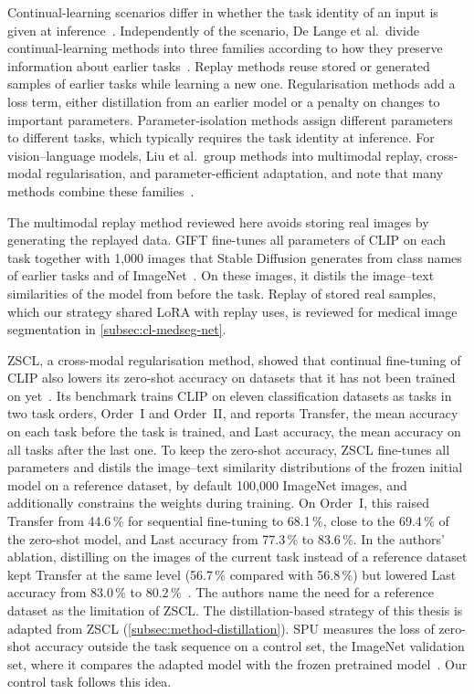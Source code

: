 Continual-learning scenarios differ in whether the task identity of an input is given at inference~\cite{van_de_Ven_2025}.
Independently of the scenario, De Lange et al.\ divide continual-learning methods into three families according to how they preserve information about earlier tasks~\cite[Sec.~3]{delange2022}.
Replay methods reuse stored or generated samples of earlier tasks while learning a new one.
Regularisation methods add a loss term, either distillation from an earlier model or a penalty on changes to important parameters.
Parameter-isolation methods assign different parameters to different tasks, which typically requires the task identity at inference.
For vision--language models, Liu et al.\ group methods into multimodal replay, cross-modal regularisation, and parameter-efficient adaptation, and note that many methods combine these families~\cite[Sec.~4]{liu2026continuallearningvlmssurvey}.

The multimodal replay method reviewed here avoids storing real images by generating the replayed data.
GIFT fine-tunes all parameters of CLIP on each task together with 1{,}000 images that Stable Diffusion generates from class names of earlier tasks and of ImageNet~\cite{wu2024gift}.
On these images, it distils the image--text similarities of the model from before the task.
Replay of stored real samples, which our strategy shared LoRA with replay uses, is reviewed for medical image segmentation in \cref{subsec:cl-medseg-net}.

ZSCL, a cross-modal regularisation method, showed that continual fine-tuning of CLIP also lowers its zero-shot accuracy on datasets that it has not been trained on yet~\cite{zheng2023preventingzeroshottransferdegradation}.
Its benchmark trains CLIP on eleven classification datasets as tasks in two task orders, Order~I and Order~II, and reports Transfer, the mean accuracy on each task before the task is trained, and Last accuracy, the mean accuracy on all tasks after the last one.
To keep the zero-shot accuracy, ZSCL fine-tunes all parameters and distils the image--text similarity distributions of the frozen initial model on a reference dataset, by default 100{,}000 ImageNet images, and additionally constrains the weights during training.
On Order~I, this raised Transfer from 44.6\,\% for sequential fine-tuning to 68.1\,\%, close to the 69.4\,\% of the zero-shot model, and Last accuracy from 77.3\,\% to 83.6\,\%.
In the authors' ablation, distilling on the images of the current task instead of a reference dataset kept Transfer at the same level (56.7\,\% compared with 56.8\,\%) but lowered Last accuracy from 83.0\,\% to 80.2\,\%~\cite[Table~1b]{zheng2023preventingzeroshottransferdegradation}.
The authors name the need for a reference dataset as the limitation of ZSCL.
The distillation-based strategy of this thesis is adapted from ZSCL (\cref{subsec:method-distillation}).
SPU measures the loss of zero-shot accuracy outside the task sequence on a control set, the ImageNet validation set, where it compares the adapted model with the frozen pretrained model~\cite{Zhang_2024_CVPR}.
Our control task follows this idea.

